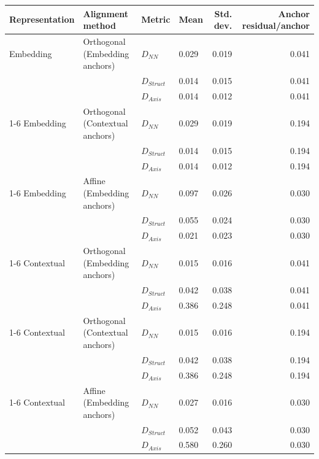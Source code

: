 \begin{tabular}{@{}llllrr@{}}
\toprule
Representation & Alignment method & Metric & Mean & Std. dev. & Anchor residual/anchor \\
\midrule
Embedding & Orthogonal (Embedding anchors) & $D_{NN}$ & 0.029 & 0.019 & 0.041 \\
 &  & $D_{Struct}$ & 0.014 & 0.015 & 0.041 \\
 &  & $D_{Axis}$ & 0.014 & 0.012 & 0.041 \\
\cmidrule(lr){1-6}
Embedding & Orthogonal (Contextual anchors) & $D_{NN}$ & 0.029 & 0.019 & 0.194 \\
 &  & $D_{Struct}$ & 0.014 & 0.015 & 0.194 \\
 &  & $D_{Axis}$ & 0.014 & 0.012 & 0.194 \\
\cmidrule(lr){1-6}
Embedding & Affine (Embedding anchors) & $D_{NN}$ & 0.097 & 0.026 & 0.030 \\
 &  & $D_{Struct}$ & 0.055 & 0.024 & 0.030 \\
 &  & $D_{Axis}$ & 0.021 & 0.023 & 0.030 \\
\cmidrule(lr){1-6}
Contextual & Orthogonal (Embedding anchors) & $D_{NN}$ & 0.015 & 0.016 & 0.041 \\
 &  & $D_{Struct}$ & 0.042 & 0.038 & 0.041 \\
 &  & $D_{Axis}$ & 0.386 & 0.248 & 0.041 \\
\cmidrule(lr){1-6}
Contextual & Orthogonal (Contextual anchors) & $D_{NN}$ & 0.015 & 0.016 & 0.194 \\
 &  & $D_{Struct}$ & 0.042 & 0.038 & 0.194 \\
 &  & $D_{Axis}$ & 0.386 & 0.248 & 0.194 \\
\cmidrule(lr){1-6}
Contextual & Affine (Embedding anchors) & $D_{NN}$ & 0.027 & 0.016 & 0.030 \\
 &  & $D_{Struct}$ & 0.052 & 0.043 & 0.030 \\
 &  & $D_{Axis}$ & 0.580 & 0.260 & 0.030 \\
\bottomrule
\end{tabular}
